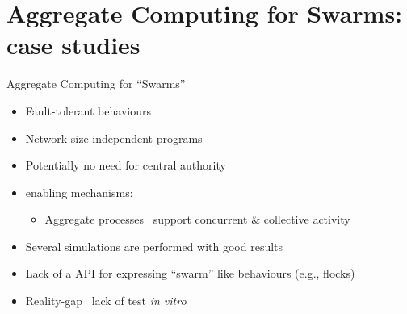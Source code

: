 \documentclass[8pt, aspectratio=169, handout]{beamer}
\begin{document}
\section{Aggregate Computing for Swarms: case studies}

\begin{frame}{Aggregate Computing for ``Swarms''}
  \begin{card}[Benefits]
    \begin{itemize}
      \item Fault-tolerant behaviours
      \item Network size-independent programs
      \item Potentially no need for central authority
      \item enabling mechanisms:
        \begin{itemize}
          \item Aggregate processes \faArrowRight \, support concurrent \& collective activity
        \end{itemize}
    \end{itemize}
  \end{card}

  \begin{card}
    \begin{itemize}
      \item Several simulations are performed with good results
      \item Lack of a API for expressing ``swarm'' like behaviours (e.g., flocks)
      \item Reality-gap \faArrowRight \, lack of test \emph{in vitro}
    \end{itemize}
  \end{card}

\end{frame}
\end{document}
